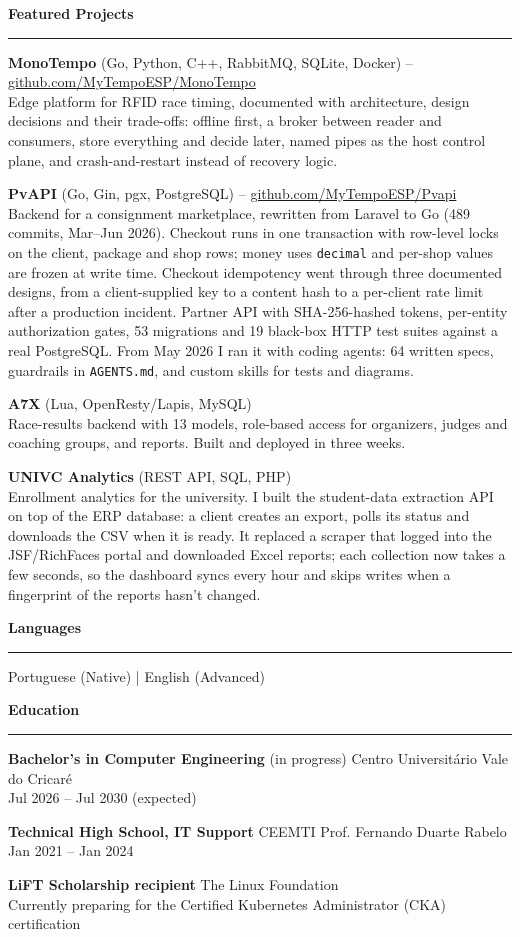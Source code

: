 \documentclass[a4paper,10pt]{article}
\newcommand{\sectiontitle}[1]{\needspace{5\baselineskip}\vspace{6pt}\noindent\textbf{\large #1}\vspace{3pt}\hrule\vspace{6pt}}
\newenvironment{smallprojects}{
	\begingroup
	\small
	\setlength{\parskip}{3pt}
}{
	\endgroup
}
\begin{document}
	\sectiontitle{Featured Projects}
	\begin{smallprojects}
		\textbf{MonoTempo} (Go, Python, C++, RabbitMQ, SQLite, Docker) -- \href{https://github.com/MyTempoESP/MonoTempo}{github.com/MyTempoESP/MonoTempo} \\
		Edge platform for RFID race timing, documented with architecture, design decisions and their trade-offs: offline first, a broker between reader and consumers, store everything and decide later, named pipes as the host control plane, and crash-and-restart instead of recovery logic.

		\textbf{PvAPI} (Go, Gin, pgx, PostgreSQL) -- \href{https://github.com/MyTempoESP/Pvapi}{github.com/MyTempoESP/Pvapi} \\
		Backend for a consignment marketplace, rewritten from Laravel to Go (489 commits, Mar--Jun 2026). Checkout runs in one transaction with row-level locks on the client, package and shop rows; money uses \texttt{decimal} and per-shop values are frozen at write time. Checkout idempotency went through three documented designs, from a client-supplied key to a content hash to a per-client rate limit after a production incident. Partner API with SHA-256-hashed tokens, per-entity authorization gates, 53 migrations and 19 black-box HTTP test suites against a real PostgreSQL. From May 2026 I ran it with coding agents: 64 written specs, guardrails in \texttt{AGENTS.md}, and custom skills for tests and diagrams.

		\textbf{A7X} (Lua, OpenResty/Lapis, MySQL) \\
		Race-results backend with 13 models, role-based access for organizers, judges and coaching groups, and reports. Built and deployed in three weeks.

		\textbf{UNIVC Analytics} (REST API, SQL, PHP) \\
		Enrollment analytics for the university. I built the student-data extraction API on top of the ERP database: a client creates an export, polls its status and downloads the CSV when it is ready. It replaced a scraper that logged into the JSF/RichFaces portal and downloaded Excel reports; each collection now takes a few seconds, so the dashboard syncs every hour and skips writes when a fingerprint of the reports hasn't changed.
	\end{smallprojects}

	\sectiontitle{Languages}
	Portuguese (Native) \quad | \quad English (Advanced)

	\sectiontitle{Education}

	\textbf{Bachelor's in Computer Engineering} (in progress) \hfill Centro Universitário Vale do Cricaré \\
	Jul 2026 -- Jul 2030 (expected)

	\textbf{Technical High School, IT Support} \hfill CEEMTI Prof. Fernando Duarte Rabelo \\
	Jan 2021 -- Jan 2024

	\textbf{LiFT Scholarship recipient} \hfill The Linux Foundation \\
	Currently preparing for the Certified Kubernetes Administrator (CKA) certification
\end{document}
